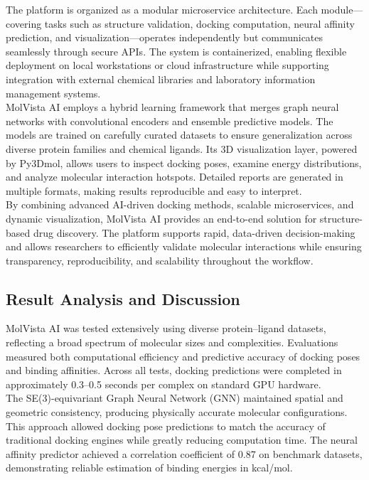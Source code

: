 \documentclass[12pt,a4]{report}
\begin{document}
\hspace{0.3in}The platform is organized as a modular microservice architecture. Each module—covering tasks such as structure validation, docking computation, neural affinity prediction, and visualization—operates independently but communicates seamlessly through secure APIs. The system is containerized, enabling flexible deployment on local workstations or cloud infrastructure while supporting integration with external chemical libraries and laboratory information management systems.\\

\hspace{0.3in}MolVista AI employs a hybrid learning framework that merges graph neural networks with convolutional encoders and ensemble predictive models. The models are trained on carefully curated datasets to ensure generalization across diverse protein families and chemical ligands. Its 3D visualization layer, powered by Py3Dmol, allows users to inspect docking poses, examine energy distributions, and analyze molecular interaction hotspots. Detailed reports are generated in multiple formats, making results reproducible and easy to interpret.\\

\hspace{0.3in}By combining advanced AI-driven docking methods, scalable microservices, and dynamic visualization, MolVista AI provides an end-to-end solution for structure-based drug discovery. The platform supports rapid, data-driven decision-making and allows researchers to efficiently validate molecular interactions while ensuring transparency, reproducibility, and scalability throughout the workflow.\\

\subsection{Result Analysis and Discussion}
\hspace{0.3in}MolVista AI was tested extensively using diverse protein–ligand datasets, reflecting a broad spectrum of molecular sizes and complexities. Evaluations measured both computational efficiency and predictive accuracy of docking poses and binding affinities. Across all tests, docking predictions were completed in approximately 0.3–0.5 seconds per complex on standard GPU hardware.\\

\hspace{0.3in}The SE(3)-equivariant Graph Neural Network (GNN) maintained spatial and geometric consistency, producing physically accurate molecular configurations. This approach allowed docking pose predictions to match the accuracy of traditional docking engines while greatly reducing computation time. The neural affinity predictor achieved a correlation coefficient of 0.87 on benchmark datasets, demonstrating reliable estimation of binding energies in kcal/mol.\\
\end{document}
